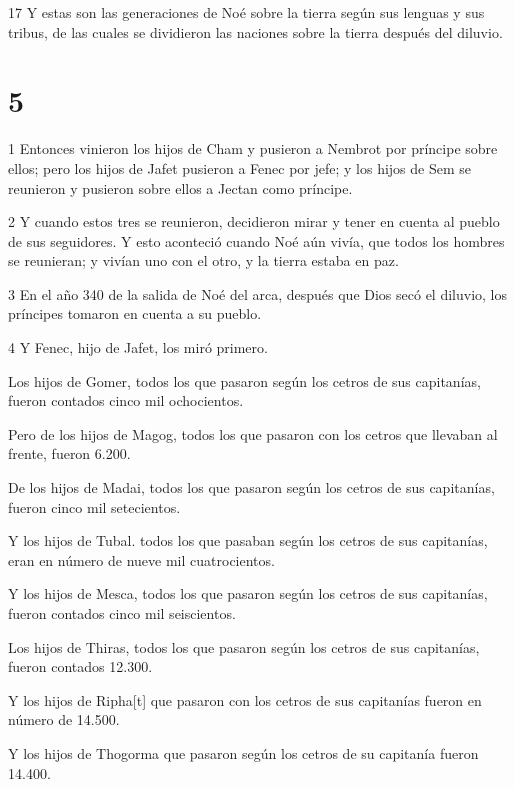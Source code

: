 \par 17 Y estas son las generaciones de Noé sobre la tierra según sus lenguas y sus tribus, de las cuales se dividieron las naciones sobre la tierra después del diluvio.

\chapter{5}

\par 1 Entonces vinieron los hijos de Cham y pusieron a Nembrot por príncipe sobre ellos; pero los hijos de Jafet pusieron a Fenec por jefe; y los hijos de Sem se reunieron y pusieron sobre ellos a Jectan como príncipe.

\par 2 Y cuando estos tres se reunieron, decidieron mirar y tener en cuenta al pueblo de sus seguidores. Y esto aconteció cuando Noé aún vivía, que todos los hombres se reunieran; y vivían uno con el otro, y la tierra estaba en paz.

\par 3 En el año 340 de la salida de Noé del arca, después que Dios secó el diluvio, los príncipes tomaron en cuenta a su pueblo.

\par 4 Y Fenec, hijo de Jafet, los miró primero.

Los hijos de Gomer, todos los que pasaron según los cetros de sus capitanías, fueron contados cinco mil ochocientos.

Pero de los hijos de Magog, todos los que pasaron con los cetros que llevaban al frente, fueron 6.200.

De los hijos de Madai, todos los que pasaron según los cetros de sus capitanías, fueron cinco mil setecientos.

\par Y los hijos de Tubal. todos los que pasaban según los cetros de sus capitanías, eran en número de nueve mil cuatrocientos.

Y los hijos de Mesca, todos los que pasaron según los cetros de sus capitanías, fueron contados cinco mil seiscientos.

Los hijos de Thiras, todos los que pasaron según los cetros de sus capitanías, fueron contados 12.300.

Y los hijos de Ripha[t] que pasaron con los cetros de sus capitanías fueron en número de 14.500.

Y los hijos de Thogorma que pasaron según los cetros de su capitanía fueron 14.400.

